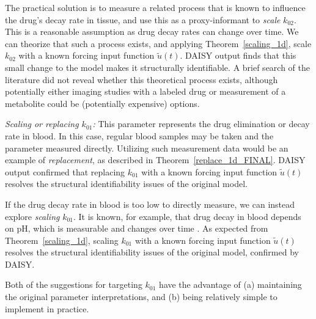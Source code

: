 \documentclass[a4paper,fleqn]{cas-dc}
\theoremstyle{definition}
\begin{document}
The practical solution is to measure a related process that is known to influence the drug's decay rate in tissue, and use this as a proxy-informant to \textit{scale} $k_{02}$.
This is a reasonable assumption as drug decay rates can change over time.
We can theorize that such a process exists, and applying Theorem~\ref{scaling_1d}, scale $k_{02}$ with a known forcing input function $\tilde{u}(t)$.
DAISY output finds that this small change to the model makes it structurally identifiable.
A brief search of the literature did not reveal whether this theoretical process exists, although potentially either imaging studies with a labeled drug or measurement of a metabolite could be (potentially expensive) options.



\vspace{0.2cm}
\noindent \textit{Scaling or replacing $k_{01}$:} This parameter represents the drug elimination or decay rate in blood.
In this case, regular blood samples may be taken and the parameter measured directly.
Utilizing such measurement data would be an example of \textit{replacement}, as described in Theorem~\ref{replace_1d_FINAL}.
DAISY output confirmed that replacing $k_{01}$ with a known forcing input function $\tilde{u}(t)$ resolves the structural identifiability issues of the original model.

If the drug decay rate in blood is too low to directly measure, we can instead explore \textit{scaling} $k_{01}$.
It is known, for example, that drug decay in blood depends on pH, which is measurable and changes over time \cite{onetto2023drug}.
As expected from Theorem~\ref{scaling_1d}, scaling $k_{01}$ with a known forcing input function $\tilde{u}(t)$ resolves the structural identifiability issues of the original model, confirmed by DAISY.
\vspace{0.2cm}

\noindent Both of the suggestions for targeting $k_{01}$ have the advantage of (a) maintaining the original parameter interpretations, and (b) being relatively simple to implement in practice.
\end{document}
